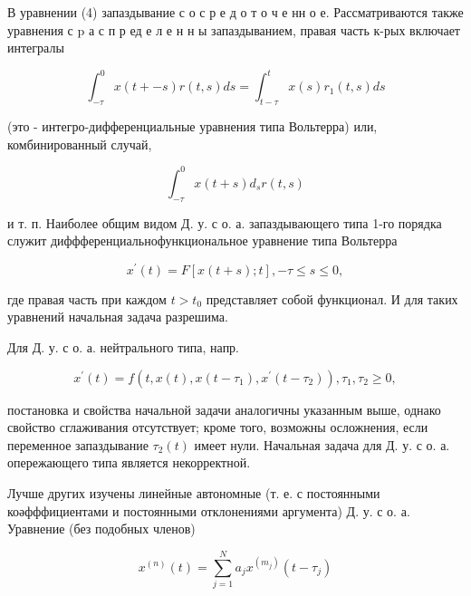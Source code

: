 \documentclass[10pt]{article}
\begin{document}
В уравнении (4) запаздывание с о с р е д о т о ч е нн о е. Рассматриваются также уравнения с $\mathrm{p}$ а с п р ед е л е н н ы запаздыванием, правая часть к-рых включает интегралы



\[

\int_{-\tau}^{0} x(t+-s) r(t, s) d s=\int_{t-\tau}^{t} x(s) r_{1}(t, s) d s

\]



(это - интегро-дифференциальные уравнения типа Вольтерра) или, комбинированный случай,



\[

\int_{-\tau}^{0} x(t+s) d_{s} r(t, s)

\]



и т. п. Наиболее общим видом Д. у. с о. а. запаздывающего типа 1-го порядка служит диффференциальнофункциональное уравнение типа Вольтерра



\[

x^{\prime}(t)=F[x(t+s) ; t],-\tau \leqslant s \leqslant 0,

\]



где правая часть при каждом $t>t_{0}$ представляет собой функционал. И для таких уравнений начальная задача разрешима.



Для Д. у. с о. а. нейтрального типа, напр.



\[

x^{\prime}(t)=f\left(t, x(t), x\left(t-\tau_{1}\right), x^{\prime}\left(t-\tau_{2}\right)\right), \tau_{1}, \tau_{2} \geqslant 0,

\]



постановка и свойства начальной задачи аналогичны указанным выше, однако свойство сглаживания отсутствует; кроме того, возможны осложнения, если переменное запаздывание $\tau_{2}(t)$ имеет нули. Начальная задача для Д. у. с о. а. опережающего типа является некорректной.



Лучше других изучены линейные автономные (т. е. с постоянными коәфффициентами и постоянными отклонениями аргумента) Д. у. с о. а. Уравнение (без подобных членов)



\[

x^{(n)}(t)=\sum_{j=1}^{N} a_{j} x^{\left(m_{j}\right)}\left(t-\tau_{j}\right)

\]
\end{document}
